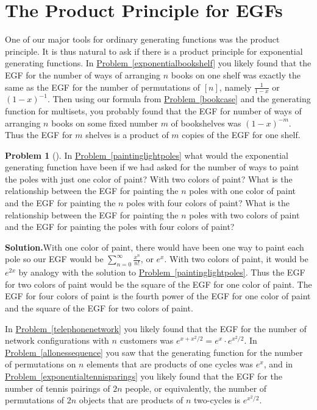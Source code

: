 \documentclass[10pt,]{book}
\theoremstyle{plain}
\theoremstyle{definition}
\newtheorem{activity}[project]{Problem}
\theoremstyle{definition}
\numberwithin{equation}{chapter}
\begin{document}
\section[{The Product Principle for EGFs}]{The Product Principle for EGFs}\label{section-25}
One of our major tools for ordinary generating functions was the product principle. It is thus natural to ask if there is a product principle for exponential generating functions. In \hyperref[exponentialbookshelf]{Problem~\ref{exponentialbookshelf}} you likely found that the EGF for the number of ways of arranging \(n\) books on one shelf was exactly the same as the EGF for the number of permutations of \([n]\), namely \(\frac{1}{1-x}\) or \((1-x)^{-1}\). Then using our formula from \hyperref[bookcase]{Problem~\ref{bookcase}} and the generating function for multisets, you probably found that the EGF for number of ways of arranging \(n\) books on some fixed number \(m\) of bookshelves was \((1-x)^{-m}\). Thus the EGF for \(m\) shelves is a product of \(m\) copies of the EGF for one shelf.%
\begin{activity}[]\label{paintinglightpoles2}
In \hyperref[paintinglightpoles]{Problem~\ref{paintinglightpoles}} what would the exponential generating function have been if we had asked for the number of ways to paint the poles with just one color of paint? With two colors of paint? What is the relationship between the EGF for painting the \(n\) poles with one color of paint and the EGF for painting the \(n\) poles with four colors of paint? What is the relationship between the EGF for painting the \(n\) poles with two colors of paint and the EGF for painting the poles with four colors of paint?%
\par\medskip\noindent%
\textbf{Solution.}\quad With one color of paint, there would have been one way to paint each pole so our EGF would be \(\sum_{n=0}^\infty \frac{x^n}{n!}\), or \(e^x\). With two colors of paint, it would be \(e^{2x}\) by analogy with the solution to \hyperref[paintinglightpoles]{Problem~\ref{paintinglightpoles}}. Thus the EGF for two colors of paint would be the square of the EGF for one color of paint. The EGF for four colors of paint is the fourth power of the EGF for one color of paint and the square of the EGF for two colors of paint.%
\end{activity}
In \hyperref[telephonenetwork]{Problem~\ref{telephonenetwork}} you likely found that the EGF for the number of network configurations with \(n\) customers was \(e^{x+x^2/2}= e^x \cdot
e^{x^2/2}\). In \hyperref[allonessequence]{Problem~\ref{allonessequence}} you saw that the generating function for the number of permutations on \(n\) elements that are products of one cycles was \(e^x\), and in \hyperref[exponentialtennisparings]{Problem~\ref{exponentialtennisparings}} you likely found that the EGF for the number of tennis pairings of \(2n\) people, or equivalently, the number of permutations of \(2n\) objects that are products of \(n\) two-cycles is \(e^{x^2/2}\).%
\end{document}
